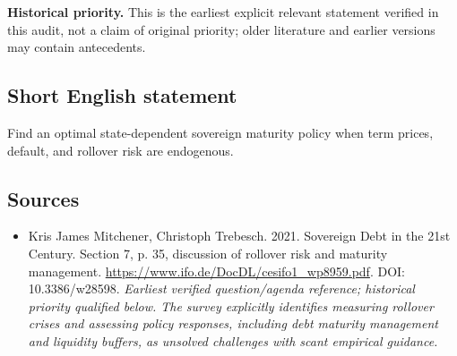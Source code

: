 \documentclass[11pt]{article}
\begin{document}
\par\textbf{Historical priority.} This is the earliest explicit relevant statement verified in this audit, not a claim of original priority; older literature and earlier versions may contain antecedents.

\subsection{Short English statement}
Find an optimal state-dependent sovereign maturity policy when term prices, default, and rollover risk are endogenous.

\subsection{Sources}
\begin{itemize}\raggedright
\item[\textnormal{[S1]}]\hypertarget{source:30007538:1}{} Kris James Mitchener, Christoph Trebesch. 2021. Sovereign Debt in the 21st Century. Section 7, p. 35, discussion of rollover risk and maturity management.
\url{https://www.ifo.de/DocDL/cesifo1_wp8959.pdf}.
DOI: 10.3386/w28598.
{\small\textit{Earliest verified question/agenda reference; historical priority qualified below. The survey explicitly identifies measuring rollover crises and assessing policy responses, including debt maturity management and liquidity buffers, as unsolved challenges with scant empirical guidance.}}
\end{itemize}
\end{document}
